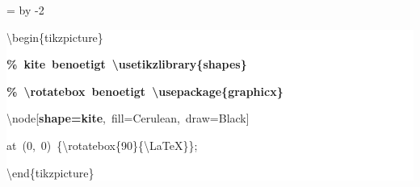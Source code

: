 \begingroup
\ttfamily
{}
=\textwidth
\advance{} by -2\fboxsep
\noindent
\colorbox{background}
{%
\parbox{\dimen255}
{%
\rule[-0.5ex]{0pt}{2.5ex}\hspace*{0.0em}\textbackslash{}begin\{tikzpicture\}\\
\rule[-0.5ex]{0pt}{2.5ex}\hspace*{1.0em}\textcolor{G}{\textbf{\%~kite~benoetigt~\textbackslash{}usetikzlibrary\{shapes\}}}\\
\rule[-0.5ex]{0pt}{2.5ex}\hspace*{1.0em}\textcolor{G}{\textbf{\%~\textbackslash{}rotatebox~benoetigt~\textbackslash{}usepackage\{graphicx\}}}\\
\rule[-0.5ex]{0pt}{2.5ex}\hspace*{1.0em}\textbackslash{}node[\textcolor{R}{\textbf{shape=kite}},~fill=Cerulean,~draw=Black]\\
\rule[-0.5ex]{0pt}{2.5ex}\hspace*{3.5em}at~(0,~0)~\{\textbackslash{}rotatebox\{90\}\{\textbackslash{}LaTeX\}\};\\
\rule[-0.5ex]{0pt}{2.5ex}\hspace*{0.0em}\textbackslash{}end\{tikzpicture\}}%
}%
\endgroup
